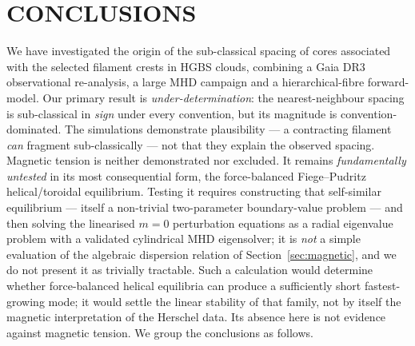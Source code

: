 \documentclass[usenatbib,twoside,twocolumn]{mnras}
\begin{document}
\section{CONCLUSIONS}

We have investigated the origin of the sub-classical spacing of cores associated with the selected filament crests in HGBS clouds, combining a Gaia DR3 observational re-analysis, a large MHD campaign and a hierarchical-fibre forward-model. Our primary result is \emph{under-determination}: the nearest-neighbour spacing is sub-classical in \emph{sign} under every convention, but its magnitude is convention-dominated. The simulations demonstrate plausibility --- a contracting filament \emph{can} fragment sub-classically --- not that they explain the observed spacing. Magnetic tension is neither demonstrated nor excluded. It remains \emph{fundamentally untested} in its most consequential form, the force-balanced Fiege--Pudritz helical/toroidal equilibrium. Testing it requires constructing that self-similar equilibrium --- itself a non-trivial two-parameter boundary-value problem --- and then solving the linearised $m=0$ perturbation equations as a radial eigenvalue problem with a validated cylindrical MHD eigensolver; it is \emph{not} a simple evaluation of the algebraic dispersion relation of Section~\ref{sec:magnetic}, and we do not present it as trivially tractable. Such a calculation would determine whether force-balanced helical equilibria can produce a sufficiently short fastest-growing mode; it would settle the linear stability of that family, not by itself the magnetic interpretation of the Herschel data. Its absence here is not evidence against magnetic tension. We group the conclusions as follows.
\end{document}

